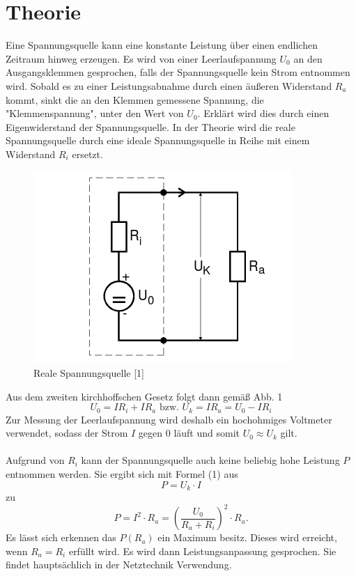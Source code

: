 \section{Theorie}
\label{sec:Theorie}

Eine Spannungsquelle kann eine konstante Leistung über einen endlichen Zeitraum
 hinweg erzeugen. Es wird von einer Leerlaufspannung $ U_0 $
an den Ausgangsklemmen gesprochen, falls der Spannungsquelle kein Strom entnommen wird.
Sobald es zu einer Leistungsabnahme durch einen äußeren Widerstand $ R_a $ kommt,
sinkt die an den Klemmen gemessene Spannung, die "Klemmenspannung", unter den Wert von $ U_0 $. Erklärt wird
dies durch einen Eigenwiderstand der Spannungsquelle. In der Theorie wird die reale
Spannungsquelle durch eine ideale Spannungsquelle in Reihe mit einem Widerstand $ R_i$
ersetzt.
\begin{figure}[H]
  \centering

  \includegraphics[width=\linewidth-200pt,height=\textheight-200pt,keepaspectratio]{content/Spannungsquelle1.png}
  \caption{Reale Spannungsquelle [1]}
  \label{fig:Spannung1}
\end{figure}

Aus dem zweiten kirchhoffschen Gesetz folgt dann gemäß Abb. 1
\begin{equation}
	 U_0 = I R_i + I R_a  \text{ bzw. } U_k = I R_a = U_0-IR_i
\end{equation}
Zur Messung der Leerlaufspannung wird deshalb ein hochohmiges Voltmeter verwendet,
sodass der Strom $I$ gegen $0$ läuft und somit $U_0 \approx U_k$ gilt.\\
\\
Aufgrund von $R_i$ kann der Spannungsquelle auch keine beliebig hohe Leistung $P$
entnommen werden. Sie ergibt sich mit Formel (1) aus
\begin{equation}
	P = U_k \cdot I
\end{equation}
zu
\begin{equation}
P = I^2 \cdot R_a = \left(\frac{U_0}{R_a+R_i}\right)^2 \cdot R_a\text{.}
\end{equation}
Es lässt sich erkennen das $P(R_a)$ ein Maximum besitz. Dieses wird erreicht, wenn $R_a = R_i$ erfüllt wird.
Es wird dann Leistungsanpassung gesprochen. Sie findet hauptsächlich in der Netztechnik Verwendung.
